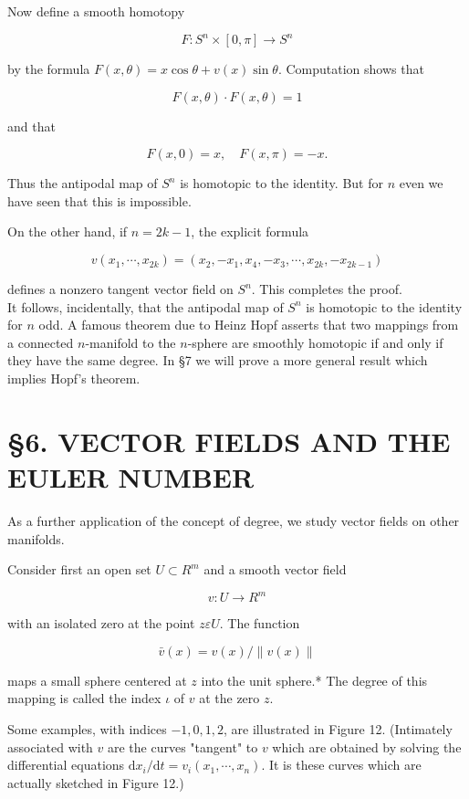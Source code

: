 \documentclass[10pt, letterpaper]{article}
\begin{document}
Now define a smooth homotopy

$$
F: S^{n} \times[0, \pi] \rightarrow S^{n}
$$

by the formula $F(x, \theta)=x \cos \theta+v(x) \sin \theta$. Computation shows that

$$
F(x, \theta) \cdot F(x, \theta)=1
$$

and that

$$
F(x, 0)=x, \quad F(x, \pi)=-x .
$$

Thus the antipodal map of $S^{n}$ is homotopic to the identity. But for $n$ even we have seen that this is impossible.

On the other hand, if $n=2 k-1$, the explicit formula

$$
v\left(x_{1}, \cdots, x_{2 k}\right)=\left(x_{2},-x_{1}, x_{4},-x_{3}, \cdots, x_{2 k},-x_{2 k-1}\right)
$$

defines a nonzero tangent vector field on $S^{n}$. This completes the proof.\\
It follows, incidentally, that the antipodal map of $S^{n}$ is homotopic to the identity for $n$ odd. A famous theorem due to Heinz Hopf asserts that two mappings from a connected $n$-manifold to the $n$-sphere are smoothly homotopic if and only if they have the same degree. In §7 we will prove a more general result which implies Hopf's theorem.

\section*{§6. VECTOR FIELDS AND THE EULER NUMBER}
As a further application of the concept of degree, we study vector fields on other manifolds.

Consider first an open set $U \subset R^{m}$ and a smooth vector field

$$
v: U \rightarrow R^{m}
$$

with an isolated zero at the point $z \varepsilon U$. The function

$$
\bar{v}(x)=v(x) /\|v(x)\|
$$

maps a small sphere centered at $z$ into the unit sphere.* The degree of this mapping is called the index $\iota$ of $v$ at the zero $z$.

Some examples, with indices $-1,0,1,2$, are illustrated in Figure 12. (Intimately associated with $v$ are the curves "tangent" to $v$ which are obtained by solving the differential equations $\mathrm{d} x_{i} / \mathrm{d} t=v_{i}\left(x_{1}, \cdots, x_{n}\right)$. It is these curves which are actually sketched in Figure 12.)
\end{document}
